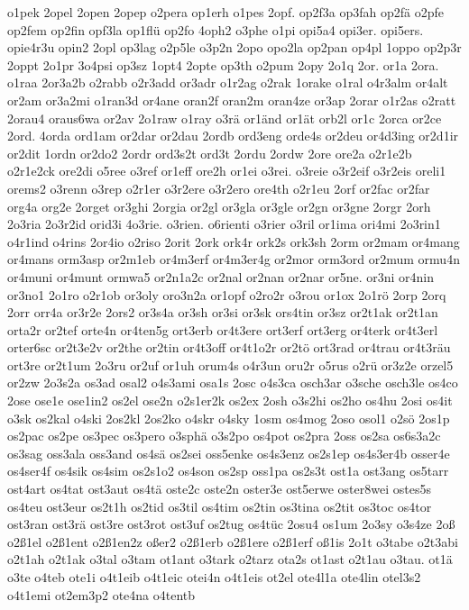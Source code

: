 {o1pek
2opel
2open
2opep
o2pera
op1erh
o1pes
2opf.
op2f3a
op3fah
op2fä
o2pfe
op2fem
op2fin
opf3la
op1flü
op2fo
4oph2
o3phe
o1pi
opi5a4
opi3er.
opi5ers.
opie4r3u
opin2
2opl
op3lag
o2p5le
o3p2n
2opo
opo2la
op2pan
op4pl
1oppo
op2p3r
2oppt
2o1pr
3o4psi
op3sz
1opt4
2opte
op3th
o2pum
2opy
2o1q
2or.
or1a
2ora.
o1raa
2or3a2b
o2rabb
o2r3add
or3adr
o1r2ag
o2rak
1orake
o1ral
o4r3alm
or4alt
or2am
or3a2mi
o1ran3d
or4ane
oran2f
oran2m
oran4ze
or3ap
2orar
o1r2as
o2ratt
2orau4
oraus6wa
or2av
2o1raw
o1ray
o3rä
or1änd
or1ät
orb2l
or1c
2orca
or2ce
2ord.
4orda
ord1am
or2dar
or2dau
2ordb
ord3eng
orde4s
or2deu
or4d3ing
or2d1ir
or2dit
1ordn
or2do2
2ordr
ord3s2t
ord3t
2ordu
2ordw
2ore
ore2a
o2r1e2b
o2r1e2ck
ore2di
o5ree
o3ref
or1eff
ore2h
or1ei
o3rei.
o3reie
o3r2eif
o3r2eis
oreli1
orems2
o3renn
o3rep
o2r1er
o3r2ere
o3r2ero
ore4th
o2r1eu
2orf
or2fac
or2far
org4a
org2e
2orget
or3ghi
2orgia
or2gl
or3gla
or3gle
or2gn
or3gne
2orgr
2orh
2o3ria
2o3r2id
orid3i
4o3rie.
o3rien.
o6rienti
o3rier
o3ril
or1ima
ori4mi
2o3rin1
o4r1ind
o4rins
2or4io
o2riso
2orit
2ork
ork4r
ork2s
ork3sh
2orm
or2mam
or4mang
or4mans
orm3asp
or2m1eb
or4m3erf
or4m3er4g
or2mor
orm3ord
or2mum
ormu4n
or4muni
or4munt
ormwa5
or2n1a2c
or2nal
or2nan
or2nar
or5ne.
or3ni
or4nin
or3no1
2o1ro
o2r1ob
or3oly
oro3n2a
or1opf
o2ro2r
o3rou
or1ox
2o1rö
2orp
2orq
2orr
orr4a
or3r2e
2ors2
or3s4a
or3sh
or3si
or3sk
ors4tin
or3sz
or2t1ak
or2t1an
orta2r
or2tef
orte4n
or4ten5g
ort3erb
or4t3ere
ort3erf
ort3erg
or4terk
or4t3erl
orter6sc
or2t3e2v
or2the
or2tin
or4t3off
or4t1o2r
or2tö
ort3rad
or4trau
or4t3räu
ort3re
or2t1um
2o3ru
or2uf
or1uh
orum4s
o4r3un
oru2r
o5rus
o2rü
or3z2e
orzel5
or2zw
2o3s2a
os3ad
osal2
o4s3ami
osa1s
2osc
o4s3ca
osch3ar
o3sche
osch3le
os4co
2ose
ose1e
ose1in2
os2el
ose2n
o2s1er2k
os2ex
2osh
o3s2hi
os2ho
os4hu
2osi
os4it
o3sk
os2kal
o4ski
2os2kl
2os2ko
o4skr
o4sky
1osm
os4mog
2oso
osol1
o2sö
2os1p
os2pac
os2pe
os3pec
os3pero
o3sphä
o3s2po
os4pot
os2pra
2oss
os2sa
os6s3a2c
os3sag
oss3ala
oss3and
os4sä
os2sei
oss5enke
os4s3enz
os2s1ep
os4s3er4b
osser4e
os4ser4f
os4sik
os4sim
os2s1o2
os4son
os2sp
oss1pa
os2s3t
ost1a
ost3ang
os5tarr
ost4art
os4tat
ost3aut
os4tä
oste2c
oste2n
oster3e
ost5erwe
oster8wei
ostes5s
os4teu
ost3eur
os2t1h
os2tid
os3til
os4tim
os2tin
os3tina
os2tit
os3toc
os4tor
ost3ran
ost3rä
ost3re
ost3rot
ost3uf
os2tug
os4tüc
2osu4
os1um
2o3sy
o3s4ze
2oß
o2ß1el
o2ß1ent
o2ß1en2z
oßer2
o2ß1erb
o2ß1ere
o2ß1erf
oß1is
2o1t
o3tabe
o2t3abi
o2t1ah
o2t1ak
o3tal
o3tam
ot1ant
o3tark
o2tarz
ota2s
ot1ast
o2t1au
o3tau.
ot1ä
o3te
o4teb
ote1i
o4t1eib
o4t1eic
otei4n
o4t1eis
ot2el
ote4l1a
ote4lin
otel3s2
o4t1emi
ot2em3p2
ote4na
o4tentb
}
